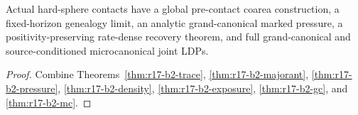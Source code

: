 \begin{theorem}
\label{thm:r17-b2-main}
Actual hard-sphere contacts have a global pre-contact coarea construction, a
fixed-horizon genealogy limit, an analytic grand-canonical marked pressure,
a positivity-preserving rate-dense recovery theorem, and full grand-canonical
and source-conditioned microcanonical joint LDPs.
\end{theorem}

\begin{proof}
Combine Theorems~\ref{thm:r17-b2-trace},
\ref{thm:r17-b2-majorant}, \ref{thm:r17-b2-pressure},
\ref{thm:r17-b2-density}, \ref{thm:r17-b2-exposure},
\ref{thm:r17-b2-gc}, and \ref{thm:r17-b2-mc}.
\end{proof}

